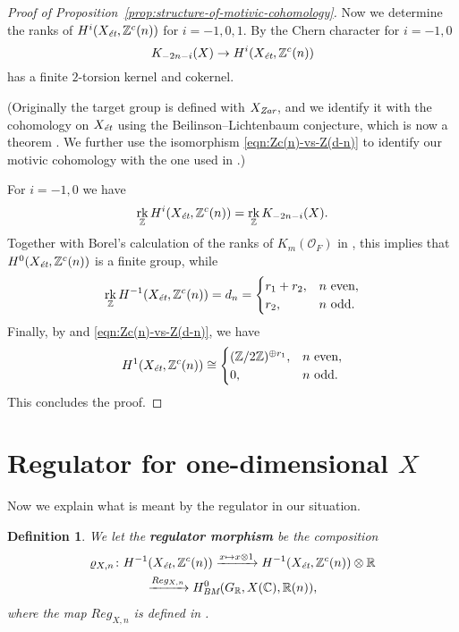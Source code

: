 \documentclass[draft]{article}
\DeclareMathOperator{\rk}{rk}
\newcommand{\CC}{\mathbb{C}}
\newcommand{\RR}{\mathbb{R}}
\newcommand{\ZZ}{\mathbb{Z}}
\newcommand{\BM}{\text{\it BM}}
\newcommand{\et}{\text{\it \'{e}t}}
\newcommand{\Zar}{\text{\it Zar}}
\theoremstyle{myplain}
\theoremstyle{mydefinition}
\newtheorem{definition}[theorem]{Definition}
\begin{document}
\begin{proof}[Proof of Proposition~\ref{prop:structure-of-motivic-cohomology}]
  Now we determine the ranks of $H^i (X_\et, \ZZ^c (n))$ for $i = -1,0,1$.
  By \cite[Proposition~2.1]{Kolster-Sands-2008} the Chern character for
  $i = -1,0$
  $$K_{-2n - i} (X) \to H^i (X_\et, \ZZ^c(n))$$
  has a finite $2$-torsion kernel and cokernel.

  (Originally the target group is defined with $X_\Zar$, and we identify it with
  the cohomology on $X_\et$ using the Beilinson--Lichtenbaum conjecture, which
  is now a theorem \cite[Theorem~1.2]{Geisser-2004-Dedekind}. We further use the
  isomorphism \eqref{eqn:Zc(n)-vs-Z(d-n)} to identify our motivic cohomology
  with the one used in \cite{Kolster-Sands-2008}.)

  For $i = -1,0$ we have
  $$\rk_\ZZ H^i (X_\et, \ZZ^c(n)) = \rk_\ZZ K_{-2n - i} (X).$$
  Together with Borel's calculation of the ranks of $K_m (\mathcal{O}_F)$ in \cite{Borel-1974}, this implies that
  $H^0 (X_\et, \ZZ^c (n))$ is a finite group, while
  \[ \rk_\ZZ H^{-1} (X_\et, \ZZ^c(n)) = d_n =
    \begin{cases}
      r_1 + r_2, & n \text{ even}, \\
      r_2, & n \text{ odd}.
    \end{cases} \]
  Finally, by \cite[p.\,179]{Kolster-Sands-2008} and
  \eqref{eqn:Zc(n)-vs-Z(d-n)}, we have
  \[ H^1 (X_\et, \ZZ^c(n)) \cong
    \begin{cases}
      (\ZZ/2\ZZ)^{\oplus r_1}, & n\text{ even}, \\
      0, & n\text{ odd}.
    \end{cases} \]
  This concludes the proof.
\end{proof}


\section{Regulator for one-dimensional $X$}
\label{sec:regulators}

Now we explain what is meant by the regulator in our situation.

\begin{definition}
  We let the \textbf{regulator morphism} be the composition
  \begin{multline*}
    \varrho_{X,n}\colon
    H^{-1} (X_\et, \ZZ^c (n)) \xrightarrow{x \mapsto x\otimes 1}
    H^{-1} (X_\et, \ZZ^c (n)) \otimes \RR \\
    \xrightarrow{Reg_{X,n}} H^0_\BM (G_\RR, X(\CC), \RR(n)),
  \end{multline*}
  where the map $Reg_{X,n}$ is defined in \cite[\S 2]{Beshenov-Weil-etale-2}.
\end{definition}
\end{document}
